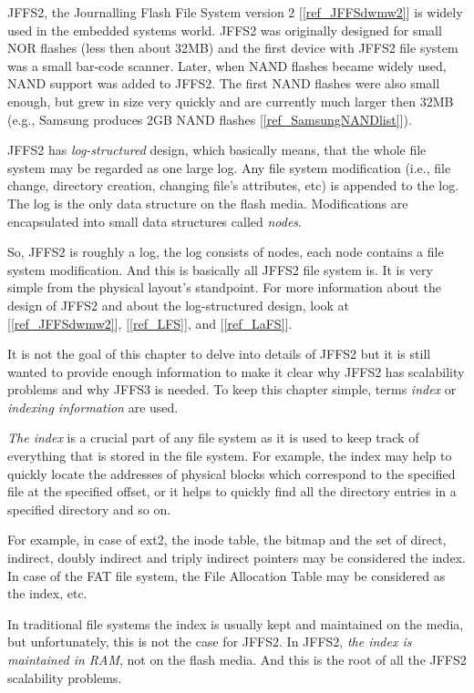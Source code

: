 \documentclass[12pt,a4paper,oneside,titlepage]{article}
\begin{document}
JFFS2, the Journalling Flash File System version 2 [\ref{ref_JFFSdwmw2}] is
widely used in the embedded systems world. JFFS2 was originally designed for
small NOR flashes (less then about 32MB) and the first device with JFFS2 file
system was a small \mbox{bar-code} scanner. Later, when NAND flashes became
widely used, NAND support was added to JFFS2. The first NAND flashes were also
small enough, but grew in size very quickly and are currently much larger then
32MB (e.g., Samsung produces 2GB NAND flashes [\ref{ref_SamsungNANDlist}]).

JFFS2 has \emph{\mbox{log-structured}} design, which basically means, that the
whole file system may be regarded as one large log. Any file system
modification (i.e., file change, directory creation, changing file's
attributes, etc) is appended to the log. The log is the only data structure on
the flash media.  Modifications are encapsulated into small data structures
called \emph{nodes}.

So, JFFS2 is roughly a log, the log consists of nodes, each node contains a
file system modification. And this is basically all JFFS2 file system is. It is
very simple from the physical layout's standpoint. For more
information about the design of JFFS2 and about the \mbox{log-structured}
design, look at [\ref{ref_JFFSdwmw2}], [\ref{ref_LFS}], and [\ref{ref_LaFS}].

It is not the goal of this chapter to delve into details of JFFS2 but it is
still wanted to provide enough information to make it clear why JFFS2 has
scalability problems and why JFFS3 is needed. To keep this chapter simple,
terms \emph{index} or \emph{indexing information} are used.

\emph{The index} is a crucial part of any file system as it is used to keep
track of everything that is stored in the file system. For example, the index
may help to quickly locate the addresses of physical blocks which correspond
to the specified file at the specified offset, or it helps to quickly find all
the directory entries in a specified directory and so on.

For example, in case of ext2, the inode table, the bitmap and the set of
direct, indirect, doubly indirect and triply indirect pointers may be
considered the index. In case of the FAT file system, the File Allocation Table
may be considered as the index, etc.

In traditional file systems the index is usually kept and maintained
on the media, but unfortunately, this is not the case for JFFS2.
In JFFS2, \emph{the index is maintained in RAM}, not on the flash media.
And this is the root of all the JFFS2 scalability problems.
\end{document}

